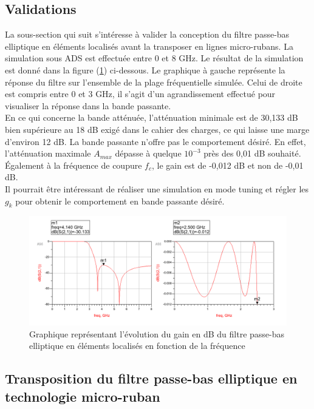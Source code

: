 \documentclass[french]{article}
\begin{document}
\newpage

\subsection*{Validations}

La sous-section qui suit s'intéresse à valider la conception du filtre passe-bas elliptique en éléments localisés avant la transposer en lignes micro-rubans. La simulation sous ADS est effectuée entre 0 et 8 GHz. Le résultat de la simulation est donné dans la figure (\ref{fig:validation_elliptique_localise}) ci-dessous. Le graphique à gauche représente la réponse du filtre sur l'ensemble de la plage fréquentielle simulée. Celui de droite est compris entre 0 et 3 GHz, il s'agit d'un agrandissement effectué pour visualiser la réponse dans la bande passante.\\
En ce qui concerne la bande atténuée, l'atténuation minimale est de 30,133 dB bien supérieure au 18 dB exigé dans le cahier des charges, ce qui laisse une marge d'environ 12 dB. La bande passante n'offre pas le comportement désiré. En effet, l'atténuation maximale $A_{max}$ dépasse à quelque $10^{-3}$ près des 0,01 dB souhaité. Également à la fréquence de coupure $f_c$, le gain est de -0,012 dB et non de -0,01 dB.\\
Il pourrait être intéressant de réaliser une simulation en mode tuning et régler les $g_k$ pour obtenir le comportement en bande passante désiré.

\begin{figure}[H]
	\centering
	\includegraphics[width=16cm]{../3synthPBas/elliptique/filtre_elliptique_localise.png}
	\caption{Graphique représentant l'évolution du gain en dB du filtre passe-bas elliptique en éléments localisés en fonction de la fréquence}
	\label{fig:validation_elliptique_localise}
\end{figure}

\subsection{Transposition du filtre passe-bas elliptique en technologie micro-ruban}
\end{document}
